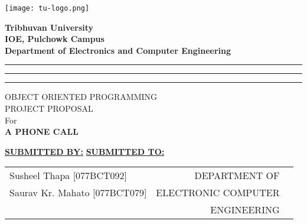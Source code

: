\documentclass[a4paper]{article}
\begin{document}

\begin{center}
	\texttt{[image: tu-logo.png]} \\

	\vspace{5pt}

	\Large{
		\textbf{
			Tribhuvan University \\
			IOE, Pulchowk Campus \\
			Department of Electronics and Computer Engineering \\
		}

		\vspace{10pt}
	}

	\rule[-80pt]{1pt}{105pt}
	\hspace{20pt}
	\rule[-100pt]{1pt}{150pt}
	\hspace{20pt}
	\rule[-80pt]{1pt}{105pt}

	\vspace{20pt}
	OBJECT ORIENTED PROGRAMMING \\
	PROJECT PROPOSAL\\
	For \\
	\textbf{
		A PHONE CALL \\
		\vspace{20pt}
	}
	\vspace{20pt}



	\textbf{\underline{SUBMITTED BY:}}
	\hfill
	\textbf{\underline{SUBMITTED TO:}} \\

	\vspace{15pt}
	\begin{tabular}{lrr}
		\Large	Susheel Thapa [077BCT092]       & DEPARTMENT OF  \\
		\Large	Saurav Kr. Mahato [077BCT079] & ELECTRONIC COMPUTER   \\
            &  ENGINEERING \\
	\end{tabular}
\end{center}
\end{document}
